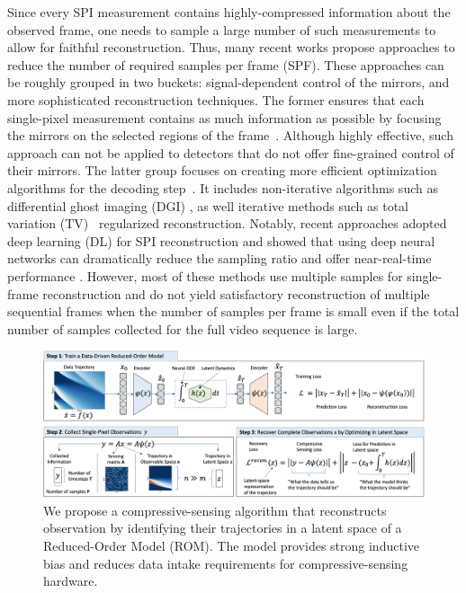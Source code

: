 Since every SPI measurement contains highly-compressed information about the observed frame, one needs to sample a large number of such measurements to allow for faithful reconstruction. Thus, many recent works propose approaches to reduce the number of required samples per frame (SPF). These approaches can be roughly grouped in two buckets: signal-dependent control of the mirrors, and more sophisticated reconstruction techniques. The former ensures that each single-pixel measurement contains as much information as possible by focusing the mirrors on the selected regions of the frame~\citep{zhang2017fast,sun2017russian,xu20181000}. Although highly effective, such approach can not be applied to detectors that do not offer fine-grained control of their mirrors. The latter group focuses on creating more efficient optimization algorithms for the decoding step~\citep{katz2009compressive}. It includes non-iterative algorithms such as differential ghost imaging (DGI) \citep{gong2010method}, as well iterative methods such as total variation (TV)~\citep{suo2016signal} regularized reconstruction. Notably, recent approaches adopted deep learning (DL) for SPI reconstruction and showed that using deep neural networks can dramatically reduce the sampling ratio and offer near-real-time performance \citep{lyu2017deep,higham2018deep,wang2019learning,wang2022single}. However, most of these methods use multiple samples for single-frame reconstruction and do not yield satisfactory reconstruction of multiple sequential frames when the number of samples per frame is small even if the total number of samples collected for the full video sequence is large.

\begin{figure}
    \centering
    \includegraphics[width=\textwidth]{figures/cs_ga_current.png}
    \caption{\label{fig:cs_abstract}We propose a compressive-sensing algorithm that reconstructs observation by identifying their trajectories in a latent space of a Reduced-Order Model (ROM). The model provides strong inductive bias and reduces data intake requirements for compressive-sensing hardware.}
\end{figure}

